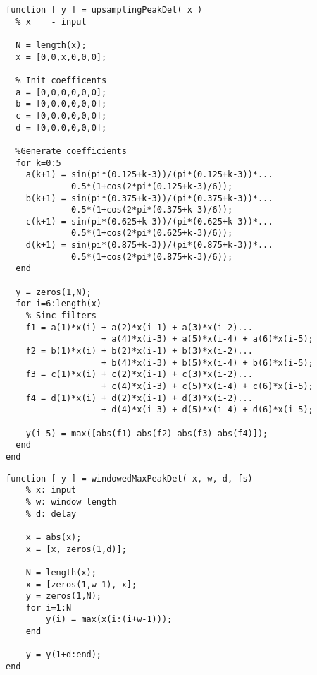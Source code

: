 \documentclass[../main2.tex]{subfiles}
\begin{document}

\begin{lstlisting}[style=customc]
function [ y ] = upsamplingPeakDet( x )
  % x    - input

  N = length(x);
  x = [0,0,x,0,0,0];
    
  % Init coefficents
  a = [0,0,0,0,0,0];
  b = [0,0,0,0,0,0];
  c = [0,0,0,0,0,0];
  d = [0,0,0,0,0,0];
    
  %Generate coefficients
  for k=0:5
    a(k+1) = sin(pi*(0.125+k-3))/(pi*(0.125+k-3))*...
             0.5*(1+cos(2*pi*(0.125+k-3)/6));
    b(k+1) = sin(pi*(0.375+k-3))/(pi*(0.375+k-3))*...
             0.5*(1+cos(2*pi*(0.375+k-3)/6));
    c(k+1) = sin(pi*(0.625+k-3))/(pi*(0.625+k-3))*...
             0.5*(1+cos(2*pi*(0.625+k-3)/6));
    d(k+1) = sin(pi*(0.875+k-3))/(pi*(0.875+k-3))*...
             0.5*(1+cos(2*pi*(0.875+k-3)/6));
  end
    
  y = zeros(1,N);
  for i=6:length(x) 
    % Sinc filters
    f1 = a(1)*x(i) + a(2)*x(i-1) + a(3)*x(i-2)...
                   + a(4)*x(i-3) + a(5)*x(i-4) + a(6)*x(i-5);
    f2 = b(1)*x(i) + b(2)*x(i-1) + b(3)*x(i-2)...
                   + b(4)*x(i-3) + b(5)*x(i-4) + b(6)*x(i-5);
    f3 = c(1)*x(i) + c(2)*x(i-1) + c(3)*x(i-2)...
                   + c(4)*x(i-3) + c(5)*x(i-4) + c(6)*x(i-5);
    f4 = d(1)*x(i) + d(2)*x(i-1) + d(3)*x(i-2)...
                   + d(4)*x(i-3) + d(5)*x(i-4) + d(6)*x(i-5);
                  
    y(i-5) = max([abs(f1) abs(f2) abs(f3) abs(f4)]);
  end
end
\end{lstlisting}
\begin{lstlisting}[style=customc]
function [ y ] = windowedMaxPeakDet( x, w, d, fs)
    % x: input
    % w: window length
    % d: delay
    
    x = abs(x);
    x = [x, zeros(1,d)];
    
    N = length(x);
    x = [zeros(1,w-1), x];
    y = zeros(1,N);
    for i=1:N
        y(i) = max(x(i:(i+w-1)));
    end
    
    y = y(1+d:end);
end
\end{lstlisting}
\end{document}
